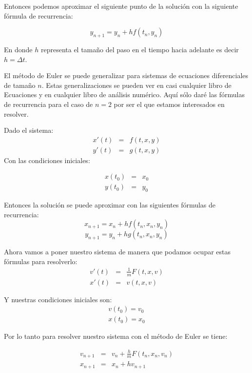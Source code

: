 Entonces podemos aproximar el siguiente punto de la solución con la siguiente fórmula de recurrencia:

$$y_{n+1} = y_n + hf(t_n, y_n)$$

En donde $h$ representa el tamaño del paso en el tiempo hacia adelante es decir $h = \Delta t$.

El método de Euler se puede generalizar para sistemas de ecuaciones diferenciales de tamaño $n$. Estas generalizaciones se pueden ver en casi cualquier libro de Ecuaciones y en cualquier libro de análisis numérico. Aquí sólo daré las fórmulas de recurrencia para el caso de $n=2$ por ser el que estamos interesados en resolver.

Dado el sistema:
\begin{eqnarray}
x'(t) & = & f(t, x, y) \nonumber \\
y'(t) & = & g(t, x, y)
\label{sistema:general}
\end{eqnarray}
Con las condiciones iniciales:

\begin{eqnarray}
x(t_0) & = & x_0 \nonumber \\
y(t_0) & = & y_0
\label{condiciones:general}
\end{eqnarray}

Entonces la solución se puede aproximar con las siguientes fórmulas de recurrencia:
$$x_{n+1} = x_n + hf(t_n, x_n, y_n)$$
$$y_{n+1} = y_n + hg(t_n, x_n, y_n)$$

Ahora vamos a poner nuestro sistema de manera que podamos ocupar estas fórmulas para resolverlo:
\begin{eqnarray}
v'(t) & = & \frac{1}{m}F(t, x, v) \nonumber \\
x'(t) & = & v(t, x, v)
\label{sistema:particular}
\end{eqnarray}

Y nuestras condiciones iniciales son:
\begin{eqnarray}
v(t_0) = v_0 \nonumber \\
x(t_0) = x_0
\label{condiciones:particular}
\end{eqnarray}

Por lo tanto para resolver nuestro sistema con el método de Euler se tiene:

\begin{eqnarray}
v_{n+1} & = & v_n + \frac{h}{m}F(t_n, x_n, v_n)\nonumber \\
x_{n+1} & = & x_n + hv_{n + 1}
\label{formulas:Euler}
\end{eqnarray}

